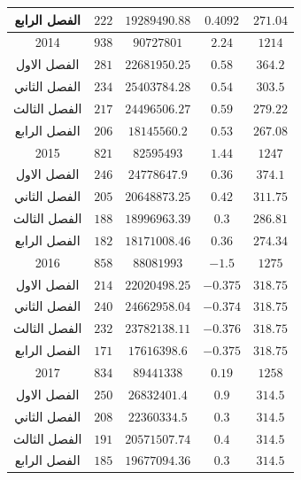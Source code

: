 \documentclass[10pt,a4paper]{report}
\begin{document}
\begin{longtable}{|c|c|c|c|c|}
	الفصل الرابع & $222$            & $19289490.88$ & $0.4092$    & $271.04$  \\ \hline
	2014         & $938$            & $90727801$    & $2.24$      & $1214$    \\ \hline
	الفصل الاول  & $281$            & $22681950.25$ & $0.58$      & $364.2$   \\ \hline
	الفصل الثاني & $234$            & $25403784.28$ & $0.54$      & $303.5$   \\ \hline
	الفصل الثالث & $217$            & $24496506.27$ & $0.59$      & $279.22$  \\ \hline
	الفصل الرابع & $206$            & $18145560.2$  & $0.53$      & $267.08$  \\ \hline
	2015         & $821$            & $82595493$    & $1.44$      & $1247$    \\ \hline
	الفصل الاول  & $246$            & $24778647.9$  & $0.36$      & $374.1$   \\ \hline
	الفصل الثاني & $205$            & $20648873.25$ & $0.42$      & $311.75$  \\ \hline
	الفصل الثالث & $188$            & $18996963.39$ & $0.3$       & $286.81$  \\ \hline
	الفصل الرابع & $182$            & $18171008.46$ & $0.36$      & $274.34$  \\ \hline
	2016         & $858$            & $88081993$    & $-1.5$      & $1275$    \\ \hline
	الفصل الاول  & $214$            & $22020498.25$ & $-0.375$    & $318.75$  \\ \hline
	الفصل الثاني & $240$            & $24662958.04$ & $-0.374$    & $318.75$  \\ \hline
	الفصل الثالث & $232$            & $23782138.11$ & $-0.376$    & $318.75$  \\ \hline
	الفصل الرابع & $171$            & $17616398.6$  & $-0.375$    & $318.75$  \\ \hline
	2017         & $834$            & $89441338$    & $0.19$      & $1258$    \\ \hline
	الفصل الاول  & $250$            & $26832401.4$  & $0.9$       & $314.5$   \\ \hline
	الفصل الثاني & $208$            & $22360334.5$  & $0.3$       & $314.5$   \\ \hline
	الفصل الثالث & $191$            & $20571507.74$ & $0.4$       & $314.5$   \\ \hline
	الفصل الرابع & $185$            & $19677094.36$ & $0.3$       & $314.5$   \\ \hline

\end{longtable}
\end{document}

